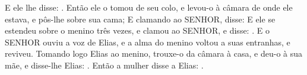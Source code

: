 {  E ele lhe disse: . Então ele o tomou de seu colo, e levou-o à câmara de onde ele estava, e pôs-lhe sobre sua cama;
  E clamando ao SENHOR, disse: 
  E ele se estendeu sobre o menino três vezes, e clamou ao SENHOR, e disse: .
  E o SENHOR ouviu a voz de Elias, e a alma do menino voltou a suas entranhas, e reviveu.
  Tomando logo Elias ao menino, trouxe-o da câmara à casa, e deu-o à sua mãe, e disse-lhe Elias: .
  Então a mulher disse a Elias: .
\par }

